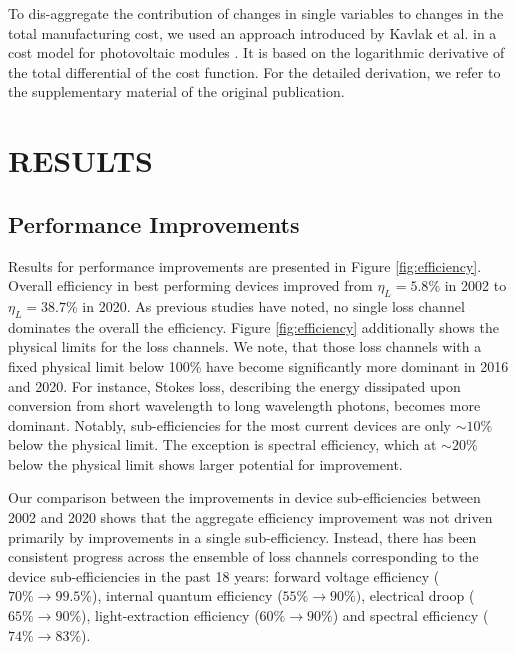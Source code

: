 \documentclass[a4paper,nocompress]{spie}  %
\begin{document}
        To dis-aggregate the contribution of changes in single variables to changes in the total manufacturing cost, we used an approach introduced by Kavlak et al. in a cost model for photovoltaic modules \cite{kavlak2018evaluating}. It is based on the logarithmic derivative of the total differential of the cost function.  For the detailed derivation, we refer to the supplementary material of the original publication.

\section{RESULTS}

\subsection{Performance Improvements}

     Results for performance improvements are presented in Figure \ref{fig:efficiency}. Overall efficiency in best performing devices improved from $\eta_L=5.8\%$ in 2002 to $\eta_L = 38.7\%$ in 2020. As previous studies have noted, no single loss channel dominates the overall the efficiency\cite{tsao2010solid}. Figure \ref{fig:efficiency} additionally shows the physical limits for the loss channels. We note, that those loss channels with a fixed physical limit below 100\% have become significantly more dominant in 2016 and 2020. For instance, Stokes loss, describing the energy dissipated upon conversion from short wavelength to long wavelength photons, becomes more dominant. Notably, sub-efficiencies for the most current devices are only $\sim10\%$ below the physical limit. The exception is spectral efficiency, which at $\sim20\%$ below the physical limit shows larger potential for improvement.
     
     Our comparison between the improvements in device sub-efficiencies between 2002 and 2020 shows that the aggregate efficiency improvement was not driven primarily by improvements in a single sub-efficiency. Instead, there has been consistent progress across the ensemble of loss channels corresponding to the device sub-efficiencies in the past 18 years: forward voltage efficiency ($70\%\rightarrow99.5\%$), internal quantum efficiency ($55\%\rightarrow90\%)$, electrical droop ($65\%\rightarrow90\%$), light-extraction efficiency ($60\%\rightarrow90\%$) and spectral efficiency ($74\% \rightarrow83\%$).
     
\end{document}
